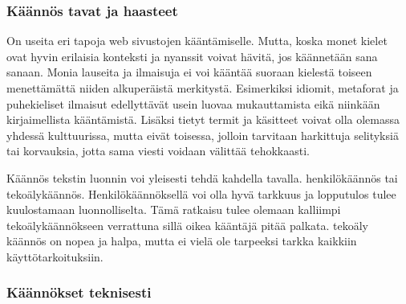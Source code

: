 \documentclass[11pt,a4paper,titlepage,oneside]{article}
\begin{document}
\subsubsection{Käännös tavat ja haasteet}







On useita eri tapoja web sivustojen kääntämiselle.
Mutta, koska monet kielet ovat hyvin erilaisia konteksti ja nyanssit voivat hävitä, jos käännetään sana sanaan.
Monia lauseita ja ilmaisuja ei voi kääntää suoraan kielestä toiseen menettämättä niiden alkuperäistä merkitystä.
Esimerkiksi idiomit, metaforat ja puhekieliset ilmaisut edellyttävät usein luovaa mukauttamista eikä niinkään kirjaimellista kääntämistä. 
Lisäksi tietyt termit ja käsitteet voivat olla olemassa yhdessä kulttuurissa, 
mutta eivät toisessa, jolloin tarvitaan harkittuja selityksiä tai korvauksia, jotta sama viesti voidaan välittää tehokkaasti.
\medskip



Käännös tekstin luonnin voi yleisesti tehdä kahdella tavalla. henkilökäännös tai tekoälykäännös.
Henkilökäännöksellä voi olla hyvä tarkkuus ja lopputulos tulee kuulostamaan luonnolliselta.
Tämä ratkaisu tulee olemaan kalliimpi tekoälykäännökseen verrattuna sillä oikea kääntäjä pitää palkata.
tekoäly käännös on nopea ja halpa, mutta ei vielä ole tarpeeksi tarkka kaikkiin käyttötarkoituksiin.
\medskip









\subsubsection{Käännökset teknisesti}



\end{document}
